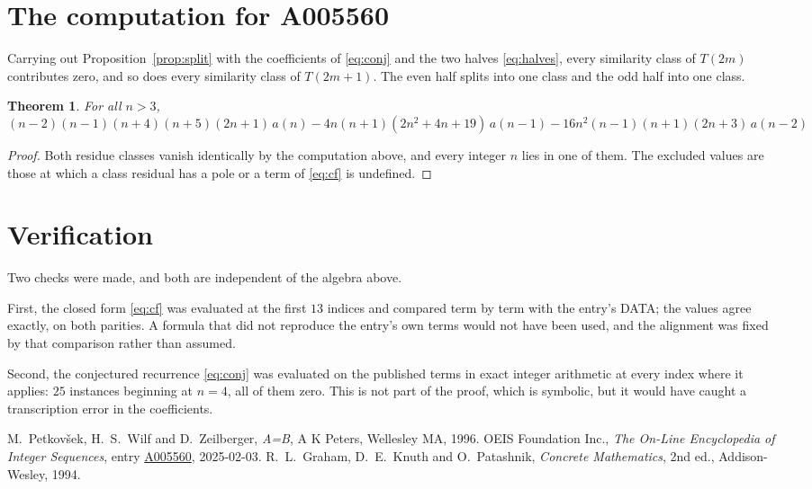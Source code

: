 \documentclass[11pt,a4paper]{article}
\theoremstyle{plain}
\newtheorem{theorem}{Theorem}
\theoremstyle{definition}
\begin{document}
\section{The computation for A005560}

Carrying out Proposition~\ref{prop:split} with the coefficients of \eqref{eq:conj} and the
two halves \eqref{eq:halves}, every similarity class of $T(2m)$ contributes zero, and so
does every similarity class of $T(2m+1)$. The even half splits into one class
and the odd half into one class.

\begin{theorem}
For all $n> 3$,
\[
\left(n - 2\right) \left(n - 1\right) \left(n + 4\right) \left(n + 5\right) \left(2 n + 1\right)\,a(n) -  4 n \left(n + 1\right) \left(2 n^{2} + 4 n + 19\right)\,a(n-1) -  16 n^{2} \left(n - 1\right) \left(n + 1\right) \left(2 n + 3\right)\,a(n-2)
\]
\end{theorem}

\begin{proof}
Both residue classes vanish identically by the computation above, and every integer $n$
lies in one of them. The excluded values are those at which a class residual has a pole or
a term of \eqref{eq:cf} is undefined.
\end{proof}

\section{Verification}

Two checks were made, and both are independent of the algebra above.

First, the closed form \eqref{eq:cf} was evaluated at the first $13$ indices and
compared term by term with the entry's DATA; the values agree exactly, on both parities. A
formula that did not reproduce the entry's own terms would not have been used, and the
alignment was fixed by that comparison rather than assumed.

Second, the conjectured recurrence \eqref{eq:conj} was evaluated on the published terms in
exact integer arithmetic at every index where it applies: $25$ instances beginning at
$n=4$, all of them zero. This is not part of the proof, which is symbolic, but it
would have caught a transcription error in the coefficients.

\begin{thebibliography}{9}
 M.~Petkov\v{s}ek, H.~S.~Wilf and D.~Zeilberger, \emph{A=B}, A K Peters,
Wellesley MA, 1996.
 OEIS Foundation Inc., \emph{The On-Line Encyclopedia of Integer Sequences},
entry \href{https://oeis.org/A005560}{A005560}, 2025-02-03.
 R.~L.~Graham, D.~E.~Knuth and O.~Patashnik, \emph{Concrete Mathematics},
2nd ed., Addison-Wesley, 1994.
\end{thebibliography}
\end{document}
